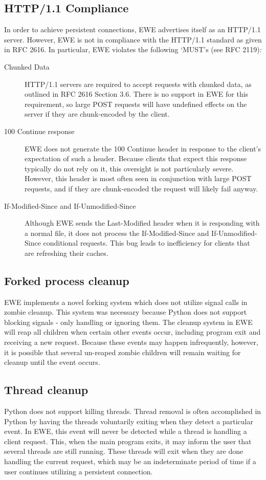 \documentclass{article}
\begin{document}
\subsection{HTTP/1.1 Compliance}
In order to achieve persistent connections, EWE advertises itself as an HTTP/1.1 server.
However, EWE is not in compliance with the HTTP/1.1 standard as given in RFC 2616.
In particular, EWE violates the following `MUST's (see RFC 2119):
\begin{description}
\item[Chunked Data] HTTP/1.1 servers are required to accept requests with chunked data, as outlined in RFC 2616 Section 3.6.
There is no support in EWE for this requirement, so large POST requests will have undefined effects on the server if they are chunk-encoded by the client.
\item[100 Continue response] EWE does not generate the 100 Continue header in response to the client's expectation of such a header.
Because clients that expect this response typically do not rely on it, this oversight is not particularly severe.
However, this header is most often seen in conjunction with large POST requests, and if they are chunk-encoded the request will likely fail anyway.
\item[If-Modified-Since and If-Unmodified-Since] Although EWE sends the Last-Modified header when it is responding with a normal file, it does not process the If-Modified-Since and If-Unmodified-Since conditional requests.
This bug leads to inefficiency for clients that are refreshing their caches.
\end{description}

\subsection{Forked process cleanup}
EWE implements a novel forking system which does not utilize signal calls in zombie cleanup.
This system was necessary because Python does not support blocking signals - only handling or ignoring them.
The cleanup system in EWE will reap all children when certain other events occur, including program exit and receiving a new request.
Because these events may happen infrequently, however, it is possible that several un-reaped zombie children will remain waiting for cleanup until the event occurs.

\subsection{Thread cleanup}
Python does not support killing threads.
Thread removal is often accomplished in Python by having the threads voluntarily exiting when they detect a particular event.
In EWE, this event will never be detected while a thread is handling a client request.
This, when the main program exits, it may inform the user that several threads are still running.
These threads will exit when they are done handling the current request, which may be an indeterminate period of time if a user continues utilizing a persistent connection.
\end{document}
